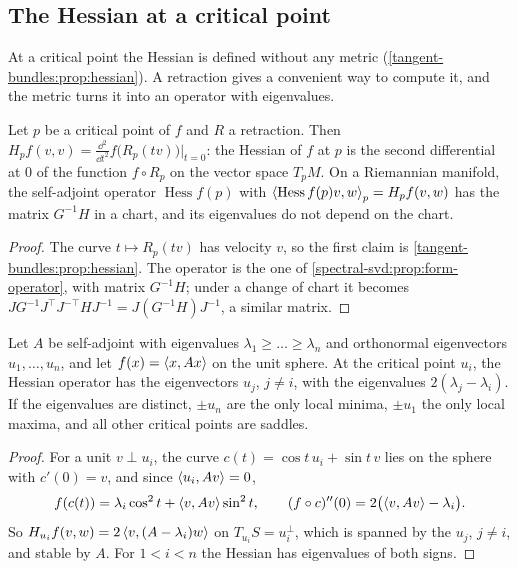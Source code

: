 \begin{notechapter}
\section{The Hessian at a critical point}
\label{riemannian-optimization:sec:hessian}

At a critical point the Hessian is defined without any metric
(\cref{tangent-bundles:prop:hessian}). A retraction gives a convenient
way to compute it, and the metric turns it into an operator with
eigenvalues.

\begin{proposition}\label{riemannian-optimization:prop:hessian}
Let $p$ be a critical point of $f$ and $R$ a retraction. Then
$H_pf(v, v) = \frac{\dd^2}{\dd t^2}f\bigl(R_p(tv)\bigr)\big|_{t=0}$: the
Hessian of $f$ at $p$ is the second differential at $0$ of the function
$f\circ R_p$ on the vector space $T_pM$. On a Riemannian manifold, the
self-adjoint operator $\operatorname{Hess}f(p)$ with
$\left\langle \operatorname{Hess}f(p)v, w \right\rangle_p = H_pf(v, w)$ has the matrix
$G^{-1}H$ in a chart, and its eigenvalues do not depend on the chart.
\end{proposition}

\begin{proof}
The curve $t\mapsto R_p(tv)$ has velocity $v$, so the first claim is
\cref{tangent-bundles:prop:hessian}. The operator is the one of
\cref{spectral-svd:prop:form-operator}, with matrix $G^{-1}H$; under a
change of chart it becomes
$JG^{-1}J^\top J^{-\top}HJ^{-1} = J(G^{-1}H)J^{-1}$, a similar matrix.
\end{proof}

\begin{theorem}
\label{riemannian-optimization:thm:saddles}
Let $A$ be self-adjoint with eigenvalues
$\lambda_1\geq\dots\geq\lambda_n$ and orthonormal eigenvectors
$u_1,\dots,u_n$, and let $f(x) = \left\langle x, Ax \right\rangle$ on the unit sphere. At the
critical point $u_i$, the Hessian operator has the eigenvectors $u_j$,
$j\neq i$, with the eigenvalues $2(\lambda_j - \lambda_i)$. If the
eigenvalues are distinct, $\pm u_n$ are the only local minima, $\pm u_1$
the only local maxima, and all other critical points are saddles.
\end{theorem}

\begin{proof}
For a unit $v\perp u_i$, the curve $c(t) = \cos t\,u_i + \sin t\,v$ lies
on the sphere with $c'(0) = v$, and since $\left\langle u_i, Av \right\rangle = 0$,
\[
  f(c(t)) = \lambda_i\cos^2t + \left\langle v, Av \right\rangle\sin^2t , \qquad
  (f\circ c)''(0) = 2\bigl(\left\langle v, Av \right\rangle - \lambda_i\bigr) .
\]
So $H_{u_i}f(v, w) = 2\left\langle v, (A - \lambda_i)w \right\rangle$ on
$T_{u_i}S = u_i^\perp$, which is spanned by the $u_j$, $j\neq i$, and
stable by $A$. For $1 < i < n$ the Hessian has eigenvalues of both signs.
\end{proof}


\end{notechapter}
